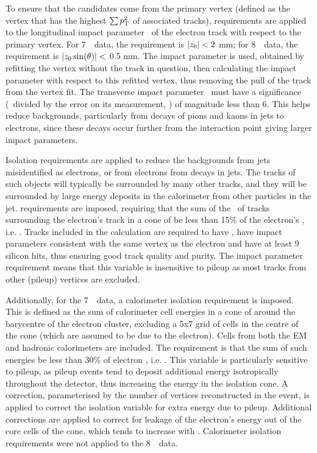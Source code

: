 To ensure that the candidates come from the primary vertex (defined as the
vertex that has the highest $\sum{\ensuremath{p_{\mathrm{T}}}^2}$ of associated tracks), requirements
are applied to the
longitudinal impact parameter \zzero\ of the electron track with respect to the
primary vertex. For 7~\tev\ data, the requirement is $|z_{0}|<2$ mm; for 8~\tev\ data,
the requirement is $|z_{0}\sin(\theta)|<$ 0.5 mm. The  impact
parameter is used, obtained by refitting the vertex without the track in
question, then calculating the impact parameter with respect to this refitted
vertex, thus removing the pull of the track from the vertex fit.  The transverse
impact parameter \dzero\ must have a significance (\dzero\ divided by the error
on its measurement, \dzerosig) of magnitude less than 6. This helps reduce backgrounds,
particularly from decays of pions and kaons in jets to electrons, since these
decays occur further from the interaction point giving larger impact
parameters.

Isolation requirements are applied to reduce the backgrounds from jets 
misidentified as electrons, or from electrons from decays in jets. The tracks of
such objects will
typically be surrounded by many other tracks, and they will be
surrounded by large energy deposits in the calorimeter from other particles in
the jet.  requirements are imposed, requiring that the
sum of the \pt\ of tracks surrounding the electron's track in a cone of
 be less than 15\% of the electron's \pt, i.e.
. Tracks included in the calculation are required to have
, have impact parameters consistent with the same vertex as the
electron and have at least 9 silicon hits, thus ensuring good track quality and
purity. The impact parameter requirement means that this variable is insensitive
to pileup as most tracks from other (pileup) vertices are excluded.

Additionally, for the 7~\tev\ data, a calorimeter isolation requirement is imposed.
This is defined as the sum of calorimeter cell energies in a cone of
 around the barycentre of the electron cluster, excluding a 5x7
grid of cells in the centre of the cone (which are assumed to be due to the
electron). Cells from both the EM and hadronic calorimeters are included. The
requirement is that the sum of such energies be less than 30\% of electron \et,
i.e. .  This variable is particularly sensitive to pileup,
as pileup events tend to deposit additional energy isotropically throughout the
detector, thus increasing the energy in the isolation cone. A correction,
parameterised by the number of vertices reconstructed in the event, is applied to
correct the isolation variable for extra energy due to pileup.  Additional
corrections are applied to correct for leakage of the electron's energy out of
the core cells of the cone, which tends to increase with \pt. Calorimeter
isolation requirements were not applied to the 8~\tev\ data.

